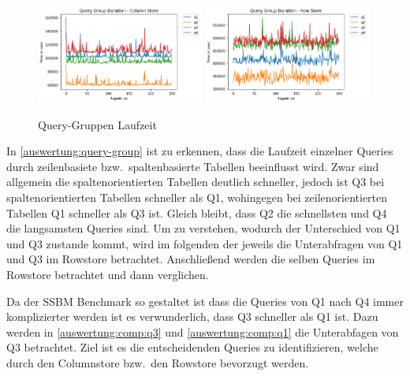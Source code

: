 \begin{figure}[H]
	\centering
	\includegraphics[width=0.49\textwidth]{images/Analysis-SSBM-HANA_18_0.png}
	\includegraphics[width=0.49\textwidth]{images/Analysis-SSBM-HANA_23_0.png}
	\caption{Query-Gruppen Laufzeit}\label{auswertung:query-group}
\end{figure}

In \autoref{auswertung:query-group} ist zu erkennen, dass die
Laufzeit einzelner Queries durch zeilenbasiete bzw.\ spaltenbasierte
Tabellen beeinflusst wird. Zwar sind allgemein die spaltenorientierten Tabellen
deutlich schneller, jedoch ist Q3 bei spaltenorientierten
Tabellen schneller als Q1, wohingegen bei zeilenorientierten Tabellen
Q1 schneller als Q3 ist.
Gleich bleibt, dass Q2 die schnellsten und Q4 die langsamsten Queries sind.
Um zu verstehen, wodurch der Unterschied von Q1 und Q3 zustande kommt, wird
im folgenden der jeweils die Unterabfragen von Q1 und Q3 im Rowstore betrachtet.
Anschließend werden die selben Queries im Rowstore betrachtet und
dann verglichen.

Da der SSBM Benchmark so gestaltet ist dass die Queries
von Q1 nach Q4 immer komplizierter werden ist es verwunderlich,
dass Q3 schneller als Q1 ist.
Dazu werden in \autoref{auswertung:comp:q3} und \autoref{auswertung:comp:q1}
die Unterabfagen von Q3 betrachtet.
Ziel ist es die entscheidenden Queries zu identifizieren, welche
durch den Columnstore bzw.\ den Rowstore bevorzugt werden.


